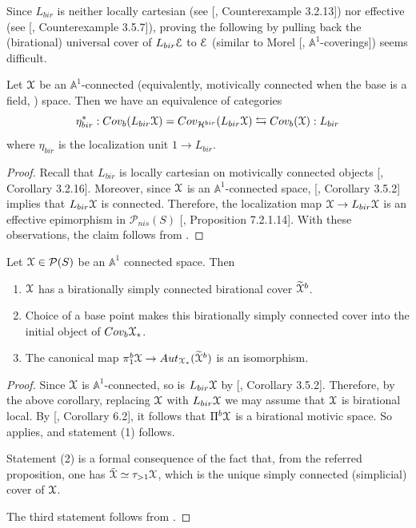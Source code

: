 Since $L_{bir}$ is neither locally cartesian (see [\cite{0bat}, Counterexample 3.2.13]) nor effective (see [\cite{0bat}, Counterexample 3.5.7]), proving the following by pulling back the (birational) universal cover of $L_{bir}\EuScript{E}$ to $\EuScript{E}$ (similar to Morel [\cite{morel2012a1}, $\mathbb{A}^1$-coverings]) seems difficult. 
 \begin{cor}\label{Lbir covering is covering of Lbir}
Let $\EuScript{X}$ be an $\mathbb{A}^1$-connected (equivalently, motivically connected when the base is a field, ) space. Then we have an equivalence of categories $$\eta^*_{bir}:Cov_{b}({L_{bir}}\EuScript{X)}=Cov_{\mathcal{H}^{bir}}({L_{bir}}\EuScript{X)}\leftrightarrows  Cov_{{b}}(\EuScript{X)}: L_{bir}$$ where $\eta_{bir}$ is the localization unit $1\to L_{bir}$.
\end{cor}
\begin{proof}
Recall that $L_{bir}$ is locally cartesian on motivically connected objects [\cite{0bat}, Corollary 3.2.16]. Moreover, since $\EuScript{X}$ is an $\mathbb{A}^1$-connected space, [\cite{0bat}, Corollary 3.5.2] implies that $L_{bir}\EuScript{X}$ is connected. Therefore, the localization map $\EuScript{X}\to L_{bir}\EuScript{X}$ is an effective epimorphism in $\mathcal{P}_{nis}(S)$ [\cite{lurie2009higher}, Proposition 7.2.1.14]. With these observations, the claim follows from .
\end{proof}


 \begin{thm}\label{universal birational covering}
 Let $\EuScript{X}\in \mathcal{P}(S)$ be an $\mathbb{A}^1$ connected space. Then 
\begin{enumerate}
    \item   $\EuScript{X}$ has a birationally simply connected birational cover $\widetilde{\EuScript{X}}^b$.
    \item Choice of a base point makes this birationally simply connected cover into the initial object of $Cov_b\EuScript{X}_*$.
    \item The canonical map $\pi_1^b\EuScript{X}\to Aut_{\EuScript{X}_*}(\widetilde{\EuScript{X}}^b)$ is an isomorphism.

\end{enumerate}    
 \end{thm}
\begin{proof}
Since $\EuScript{X}$ is $\mathbb{A}^1$-connected, so is $L_{bir}\EuScript{X}$ by [\cite{0bat}, Corollary 3.5.2]. Therefore, by the above corollary, replacing $\EuScript{X}$ with $L_{bir}\EuScript{X}$ we may assume that $\EuScript{X}$ is birational local. By [\cite{morel2012a1}, Corollary 6.2], it follows that $\Pi^{b}\EuScript{X}$ is a birational motivic space. So  applies, and statement (1) follows. 

Statement (2) is a formal consequence of the fact that, from the referred proposition, one has $\tilde{\EuScript{X}}\simeq \tau_{>1}\EuScript{X}$, which is the unique simply connected (simplicial) cover of $\EuScript{X}$. 

The third statement follows from .
\end{proof}

